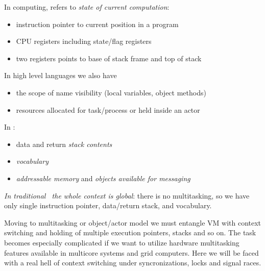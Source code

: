 \label{context}

In computing,  refers to \emph{state of current computation}:
\begin{itemize}[nosep]
  \item
instruction pointer to current position in a program
  \item
CPU registers including state/flag registers 
  \item
two registers points to base of stack frame and top of stack
\end{itemize} 
In high level languages we also have
\begin{itemize}[nosep]
  \item the scope of name visibility (local variables, object methods)
  \item resources allocated for task/process or held inside an actor
\end{itemize}
In \F:
\begin{itemize}[nosep]
  \item data and return \emph{stack contents}
  \item \emph{vocabulary}
  \item \emph{addressable memory} and \textit{objects available for messaging}
\end{itemize}

\clearpage\noindent
\emph{In traditional \F\ the whole context is global}: there is no multitasking,
so we have only single instruction pointer, data/return stack, and
vocabulary.

Moving to multitasking or object/actor model we must entangle VM with context
switching and holding of multiple execution pointers, stacks and so on. The task
becomes especially complicated if we want to utilize hardware multitasking
features available in multicore systems and grid computers. Here we will be
faced with a real hell of context switching under syncronizations, locks and
signal races.
